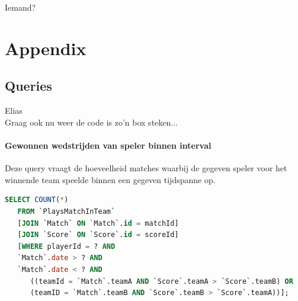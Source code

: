 \documentclass[11pt]{article}
\begin{document}
Iemand?



\section{Appendix}

\subsection{Queries}

Elias\\
Graag ook nu weer de code is zo'n box steken...


\paragraph{Gewonnen wedstrijden van speler binnen interval}

  Deze query vraagt de hoeveelheid matches waarbij de gegeven speler voor het winnende team speelde binnen een gegeven tijdspanne op.

  \begin{framed}
  \begin{lstlisting}[language=sql]
  SELECT COUNT(*)
   FROM `PlaysMatchInTeam`
   [JOIN `Match` ON `Match`.id = matchId]
   [JOIN `Score` ON `Score`.id = scoreId]
   [WHERE playerId = ? AND
   `Match`.date > ? AND
   `Match`.date < ? AND
      ((teamId = `Match`.teamA AND `Score`.teamA > `Score`.teamB) OR
      (teamID = `Match`.teamB AND `Score`.teamB > `Score`.teamA))];
  \end{lstlisting}
  \end{framed}
\end{document}

